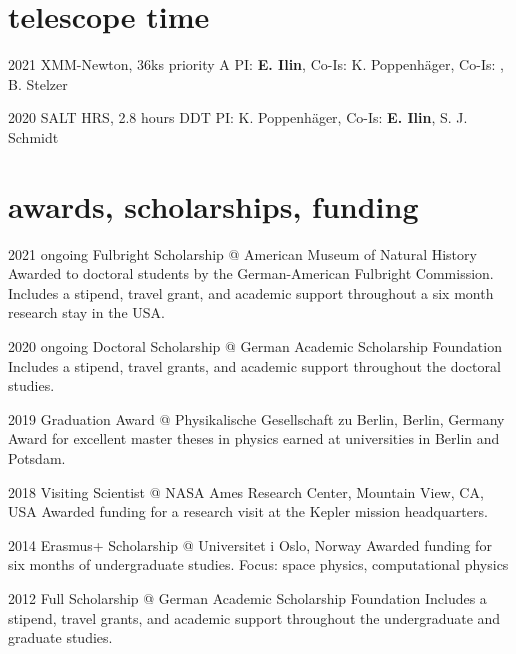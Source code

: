 \documentclass[9.5pt]{k-cv} %
\begin{document}
\section{telescope time}

\begin{entrylist}

\entry
{2021}
{XMM-Newton, 36ks priority A}
{}
{PI: \textbf{E. Ilin}, Co-Is: K. Poppenh\"ager, Co-Is: , B. Stelzer}

\entry
{2020 }
{SALT HRS, 2.8 hours DDT}
{}
{PI: K. Poppenh\"ager, Co-Is: \textbf{E. Ilin}, S. J. Schmidt}




\end{entrylist}

\section{awards, scholarships, funding}
\begin{entrylist}
\entry
{2021 \to ongoing}
{Fulbright Scholarship @ American Museum of Natural History}
{ }
{Awarded to doctoral students by the German-American Fulbright Commission. Includes a stipend, travel grant, and academic support throughout a  six month research stay in the USA.}

\entry
{2020 \to ongoing}
{Doctoral Scholarship @ German Academic Scholarship Foundation}
{}
{Includes a stipend, travel grants, and academic support throughout the doctoral studies.}

\entry
{2019}
{Graduation Award @ Physikalische Gesellschaft zu Berlin, Berlin, Germany}
{}
{Award for excellent master theses in physics earned at universities in Berlin and Potsdam.}


\entry
{2018}
{Visiting Scientist @ NASA Ames Research Center, Mountain View, CA, USA}
{}
{Awarded funding for a research visit at the Kepler mission headquarters.}


\entry
{2014}
{Erasmus+ Scholarship @ Universitet i Oslo, Norway}
{}
{Awarded funding for six months of undergraduate studies.
Focus: space physics, computational physics}

\entry
{2012 }
{Full Scholarship @ German Academic Scholarship Foundation}
{}
{Includes a stipend, travel grants, and academic support throughout the undergraduate and graduate studies.}

\end{entrylist}
\end{document}
